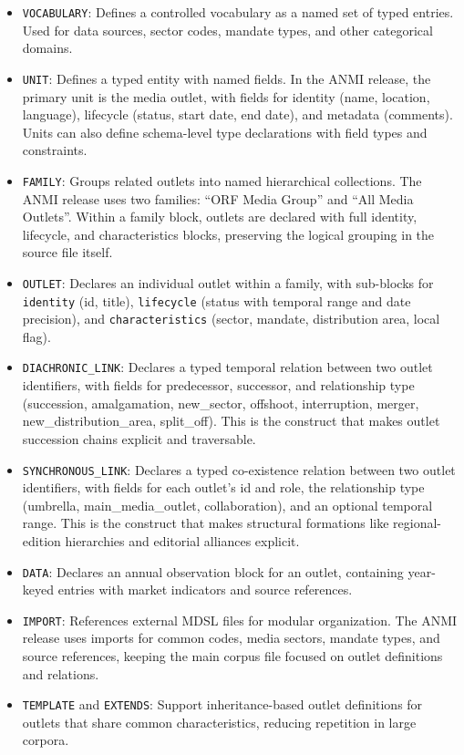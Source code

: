 \documentclass[11pt]{article}
\begin{document}
\begin{itemize}
\item \texttt{VOCABULARY}: Defines a controlled vocabulary as a named set of typed entries. Used for data sources, sector codes, mandate types, and other categorical domains.

\item \texttt{UNIT}: Defines a typed entity with named fields. In the ANMI release, the primary unit is the media outlet, with fields for identity (name, location, language), lifecycle (status, start date, end date), and metadata (comments). Units can also define schema-level type declarations with field types and constraints.

\item \texttt{FAMILY}: Groups related outlets into named hierarchical collections. The ANMI release uses two families: ``ORF Media Group'' and ``All Media Outlets''. Within a family block, outlets are declared with full identity, lifecycle, and characteristics blocks, preserving the logical grouping in the source file itself.

\item \texttt{OUTLET}: Declares an individual outlet within a family, with sub-blocks for \texttt{identity} (id, title), \texttt{lifecycle} (status with temporal range and date precision), and \texttt{characteristics} (sector, mandate, distribution area, local flag).

\item \texttt{DIACHRONIC\_LINK}: Declares a typed temporal relation between two outlet identifiers, with fields for predecessor, successor, and relationship type (succession, amalgamation, new\_sector, offshoot, interruption, merger, new\_distribution\_area, split\_off). This is the construct that makes outlet succession chains explicit and traversable.

\item \texttt{SYNCHRONOUS\_LINK}: Declares a typed co-existence relation between two outlet identifiers, with fields for each outlet's id and role, the relationship type (umbrella, main\_media\_outlet, collaboration), and an optional temporal range. This is the construct that makes structural formations like regional-edition hierarchies and editorial alliances explicit.

\item \texttt{DATA}: Declares an annual observation block for an outlet, containing year-keyed entries with market indicators and source references.

\item \texttt{IMPORT}: References external MDSL files for modular organization. The ANMI release uses imports for common codes, media sectors, mandate types, and source references, keeping the main corpus file focused on outlet definitions and relations.

\item \texttt{TEMPLATE} and \texttt{EXTENDS}: Support inheritance-based outlet definitions for outlets that share common characteristics, reducing repetition in large corpora.
\end{itemize}
\end{document}
